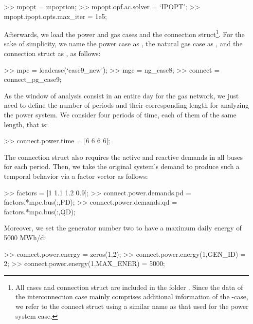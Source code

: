 \begin{Code}
>> mpopt = mpoption;                   %
>> mpopt.opf.ac.solver = `IPOPT';      %
>> mpopt.ipopt.opts.max_iter = 1e5;    %
\end{Code}

Afterwards, we load the power and gas cases and the connection struct\footnote{All cases and connection struct are included in the folder \mpngcasepath{}. Since the data of the interconnection case mainly comprises additional information of the \matpower{}-case, we refer to the connect struct using a similar name as that used for the power system case.}. For the sake of simplicity, we name the power case as , the natural gas case as ,  and the connection struct as , as follows: 

\begin{Code}
>> mpc = loadcase(`case9_new');    %
>> mgc = ng_case8;                 %
>> connect = connect_pg_case9;     %
\end{Code}

As the window of analysis consist in an entire day for the gas network, we just need to define the number of periods and their corresponding length for analyzing the power system. We consider four periods of time, each of them of the same length, that is:

\begin{Code}
>> connect.power.time = [6 6 6 6];   %
\end{Code}

The connection struct also requires the active and reactive demands in all buses for each period. Then, we take the original system's demand to produce such a temporal behavior via a factor vector as follows:  

\begin{Code}
>> factors = [1 1.1 1.2 0.9];      %
>> connect.power.demands.pd = factors.*mpc.bus(:,PD);  %
>> connect.power.demands.qd = factors.*mpc.bus(:,QD);  %
\end{Code}

Moreover, we set the generator number two to have a maximum daily energy of 5000 MWh/d:

\begin{Code}
>> connect.power.energy = zeros(1,2);  %
>> connect.power.energy(1,GEN_ID) = 2;         %
>> connect.power.energy(1,MAX_ENER) = 5000;    %
\end{Code}

